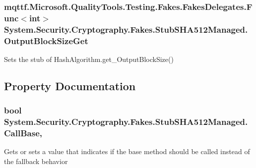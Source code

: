 \hypertarget{class_system_1_1_security_1_1_cryptography_1_1_fakes_1_1_stub_s_h_a512_managed_ac0b3214ba8c00960c29f08e348f85ffd}{
\subsubsection[{Output\-Block\-Size\-Get}]{\setlength{\rightskip}{0pt plus 5cm}mqttf.\-Microsoft.\-Quality\-Tools.\-Testing.\-Fakes.\-Fakes\-Delegates.\-Func$<$int$>$ System.\-Security.\-Cryptography.\-Fakes.\-Stub\-S\-H\-A512\-Managed.\-Output\-Block\-Size\-Get}}\label{class_system_1_1_security_1_1_cryptography_1_1_fakes_1_1_stub_s_h_a512_managed_ac0b3214ba8c00960c29f08e348f85ffd}


Sets the stub of Hash\-Algorithm.\-get\-\_\-\-Output\-Block\-Size()



\subsection{Property Documentation}
\hypertarget{class_system_1_1_security_1_1_cryptography_1_1_fakes_1_1_stub_s_h_a512_managed_a6ae0c14604d221e5593c1317c94b9acc}{
\subsubsection[{Call\-Base}]{\setlength{\rightskip}{0pt plus 5cm}bool System.\-Security.\-Cryptography.\-Fakes.\-Stub\-S\-H\-A512\-Managed.\-Call\-Base\hspace{0.3cm}{\ttfamily [get]}, {\ttfamily [set]}}}\label{class_system_1_1_security_1_1_cryptography_1_1_fakes_1_1_stub_s_h_a512_managed_a6ae0c14604d221e5593c1317c94b9acc}


Gets or sets a value that indicates if the base method should be called instead of the fallback behavior


